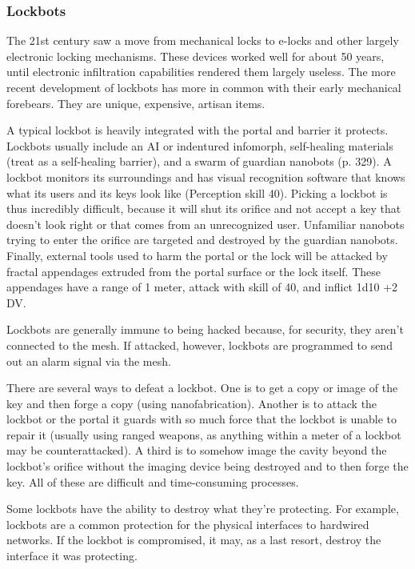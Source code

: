 
\subsubsection{Lockbots}

The 21st century saw a move from mechanical 
locks to e-locks and other largely electronic locking 
mechanisms. These devices worked well for about 
50 years, until electronic infiltration  capabilities 
rendered them largely useless. The more recent development
of lockbots has more in common with
their early mechanical forebears. They are unique, 
expensive, artisan items.

A typical lockbot is heavily integrated with the 
portal and barrier it protects. Lockbots usually 
include an AI or indentured infomorph, self-healing 
materials (treat as a self-healing barrier), and a 
swarm of guardian nanobots (p. 329). A lockbot 
monitors its surroundings and has visual recognition
software that knows what its users and its keys
look like (Perception skill 40). Picking a lockbot is 
thus incredibly difficult, because it will shut its orifice
and not accept a key that doesn't look right or
that comes from an unrecognized user. Unfamiliar 
nanobots trying to enter the orifice are targeted and 
destroyed by the guardian nanobots. Finally, external
tools used to harm the portal or the lock will be
attacked by fractal appendages extruded from the 
portal surface or the lock itself. These appendages 
have a range of 1 meter, attack with skill of 40, and 
inflict 1d10 +2 DV.

Lockbots are generally immune to being hacked 
because, for security, they aren't connected to 
the mesh. If attacked, however, lockbots are programmed
to send out an alarm signal via the mesh.

There are several ways to defeat a lockbot. One 
is to get a copy or image of the key and then forge 
a copy (using nanofabrication). Another is to attack 
the lockbot or the portal it guards with so much 
force that the lockbot is unable to repair it (usually 
using ranged weapons, as anything within a meter 
of a lockbot may be counterattacked). A third is to 
somehow image the cavity beyond the lockbot's orifice
without the imaging device being destroyed and
to then forge the key. All of these are difficult and 
time-consuming processes.

Some lockbots have the ability to destroy what 
they're protecting. For example, lockbots are a 
common protection for the physical interfaces to 
hardwired networks. If the lockbot is compromised, 
it may, as a last resort, destroy the interface it was 
protecting.

